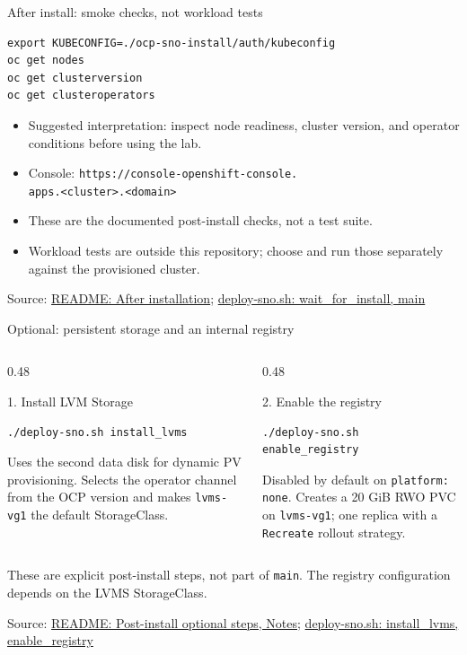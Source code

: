 \documentclass[aspectratio=169,11pt]{beamer}
\newcommand{\reposource}[1]{\par\vfill{\tiny Source: #1\par}}
\newcommand{\readmeref}[1]{\href{https://github.com/matejvasek/mycluster/blob/master/README.md}{README: #1}}
\newcommand{\scriptref}[1]{\href{https://github.com/matejvasek/mycluster/blob/master/deploy-sno.sh}{deploy-sno.sh: #1}}
\begin{document}
\begin{frame}[fragile]{After install: smoke checks, not workload tests}
\begin{verbatim}
export KUBECONFIG=./ocp-sno-install/auth/kubeconfig
oc get nodes
oc get clusterversion
oc get clusteroperators
\end{verbatim}
  \begin{itemize}
    \item Suggested interpretation: inspect node readiness, cluster version,
      and operator conditions before using the lab.
    \item Console: \texttt{https://console-openshift-console.}\\
      \texttt{apps.<cluster>.<domain>}
    \item These are the documented post-install checks, not a test suite.
    \item Workload tests are outside this repository; choose and run those
      separately against the provisioned cluster.
  \end{itemize}
  \reposource{\readmeref{After installation}; \scriptref{wait\_for\_install, main}}
\end{frame}

\begin{frame}[fragile]{Optional: persistent storage and an internal registry}
  \begin{columns}[T,onlytextwidth]
    \begin{column}{0.48\textwidth}
      \begin{block}{1. Install LVM Storage}
\begin{verbatim}
./deploy-sno.sh install_lvms
\end{verbatim}
        \small Uses the second data disk for dynamic PV provisioning.
        Selects the operator channel from the OCP version and makes
        \texttt{lvms-vg1} the default StorageClass.
      \end{block}
    \end{column}
    \begin{column}{0.48\textwidth}
      \begin{block}{2. Enable the registry}
\begin{verbatim}
./deploy-sno.sh enable_registry
\end{verbatim}
        \small Disabled by default on \texttt{platform: none}.
        Creates a 20 GiB RWO PVC on \texttt{lvms-vg1}; one replica
        with a \texttt{Recreate} rollout strategy.
      \end{block}
    \end{column}
  \end{columns}
  \medskip
  \small These are explicit post-install steps, not part of \texttt{main}.
  The registry configuration depends on the LVMS StorageClass.
  \reposource{\readmeref{Post-install optional steps, Notes}; \scriptref{install\_lvms, enable\_registry}}
\end{frame}
\end{document}
